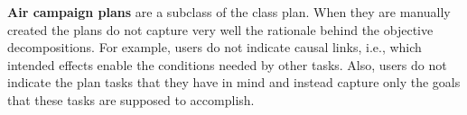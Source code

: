 
{\bf Air campaign plans} are a subclass of the class plan.
When they are manually created the plans do not 
capture very well the rationale behind the 
objective decompositions.  
For example, users do not indicate causal links, i.e., which
intended effects enable the conditions needed by other tasks.  
Also, users do not indicate the 
plan tasks that they have in mind and instead capture 
only the goals that these tasks are supposed to accomplish. 



